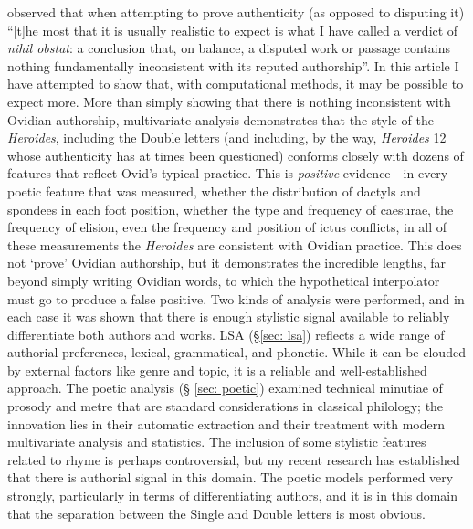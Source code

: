 \documentclass[twocolumn, switch, a4paper]{article} %
\begin{document}
 observed that when attempting to prove authenticity
 (as opposed to disputing it) ``[t]he most that it is usually realistic to
 expect is what I have called a verdict of \emph{nihil obstat}: a conclusion
 that, on balance, a disputed work or passage contains nothing fundamentally
 inconsistent with its reputed authorship''. In this article I have attempted
 to show that, with computational methods, it may be possible to expect more.
 More than simply showing that there is nothing inconsistent with Ovidian
 authorship, multivariate analysis demonstrates that the style of the
 \emph{Heroides}, including the Double letters (and including, by the way,
 \emph{Heroides} 12 whose authenticity has at times been questioned) conforms
 closely with dozens of features that reflect Ovid's typical practice. This is
 \emph{positive} evidence---in every poetic feature that was measured, whether
 the distribution of dactyls and spondees in each foot position, whether the
 type and frequency of caesurae, the frequency of elision, even the frequency
 and position of ictus conflicts, in all of these measurements the
 \emph{Heroides} are consistent with Ovidian practice. This does not `prove'
 Ovidian authorship, but it demonstrates the incredible lengths, far beyond
 simply writing Ovidian words, to which the hypothetical interpolator must go
 to produce a false positive. Two kinds of analysis were performed, and in
 each case it was shown that there is enough stylistic signal available to
 reliably differentiate both authors and works. LSA (\S \ref{sec: lsa})
 reflects a wide range of authorial preferences, lexical, grammatical, and
 phonetic. While it can be clouded by external factors like genre and topic,
 it is a reliable and well-established approach. The poetic analysis (\S
 \ref{sec: poetic}) examined technical minutiae of prosody and metre that are
 standard considerations in classical philology; the innovation lies in their
 automatic extraction and their treatment with modern multivariate analysis
 and statistics. The inclusion of some stylistic features related to rhyme
 is perhaps controversial, but my recent research \cite{nagy_rhyme_2022} has
 established that there is authorial signal in this domain. The poetic models
 performed very strongly, particularly in terms of differentiating authors,
 and it is in this domain that the separation between the Single and Double
 letters is most obvious.
\end{document}
